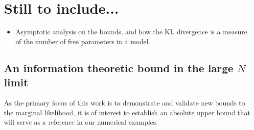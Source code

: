 \documentclass{article}
\begin{document}
\section*{Still to include...}
\begin{itemize}
    \item Asymptotic analysis on the bounds, and how the KL divergence is a measure of the number of free parameters in a model.
\end{itemize}


\subsection{An information theoretic bound in the large $N$ limit}
As the primary focus of this work is to demonstrate and validate new bounds to the marginal likelihood, it is of interest to establish an absolute upper bound that will serve as a reference in our numerical examples. 
\end{document}
